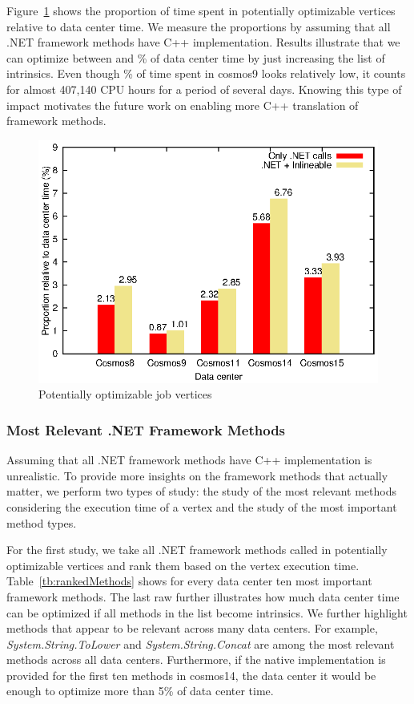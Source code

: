Figure~\ref{fig:potentially} shows the proportion of time spent in potentially optimizable vertices relative to data center time. 
We measure the proportions by assuming that all .NET framework methods have C++ implementation.
Results illustrate that we can optimize between \potentiallyOptimizableL{} and \potentiallyOptimizableU{} \% of data center time by just increasing the list of intrinsics. 
Even though \potentiallyOptimizableL{} \% of time spent in cosmos9 looks relatively low, it counts for almost 407,140 CPU hours for a period of several days. 
Knowing this type of impact motivates the future work on enabling more C++ translation of framework methods.

\begin{figure}[ht]
\includegraphics[scale=0.8]{graphs/potentiallyOptimizable}

\caption{Potentially optimizable job vertices}
\label{fig:potentially}
\end{figure}

\subsubsection{Most Relevant .NET Framework Methods}
Assuming that all .NET framework methods have C++ implementation is unrealistic. 
To provide more insights on the framework methods that actually matter, we perform two types of study:
the study of the most relevant methods considering the execution time of a vertex and the study of the most important method types. 

For the first study, we take all .NET framework methods called in potentially optimizable vertices and rank them based on the vertex execution time. 
Table~\ref{tb:rankedMethods} shows for every data center ten most important framework methods. 
The last raw further illustrates how much data center time can be optimized if all methods in the list become intrinsics.
We further highlight methods that appear to be relevant across many data centers.
For example, \emph{System.String.ToLower} and \emph{System.String.Concat} are among the most relevant methods across all data centers.
Furthermore, if the native implementation is provided for the first ten methods in cosmos14, the data center it would be enough to optimize more than 5\% of data center time.

